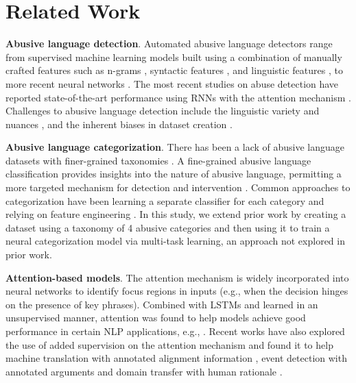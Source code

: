 \documentclass[letterpaper]{article}
\begin{document}
\section{Related Work}
\label{sec:related}

\noindent\textbf{Abusive language detection}. Automated abusive language detectors range from supervised machine learning models built using a combination of manually crafted features such as n-grams \cite{wulczyn2017ex}, syntactic features \cite{nobata2016abusive}, and linguistic features \cite{yin2009detection,joksimovic2019automated}, to more recent neural networks \cite{park2017one,maity2018opinion}.
{The most recent studies on abuse detection have reported  state-of-the-art performance using RNNs with the attention mechanism  \cite{pavlopoulos2017deeper,chakrabarty2019pay}.} Challenges to abusive language detection include the linguistic variety and nuances \cite{nobata2016abusive,schmidt2017survey},  and the inherent biases in dataset creation \cite{vidgen2019challenges}.

\noindent\textbf{Abusive language categorization}. There has been a lack of abusive language datasets with finer-grained taxonomies \cite{park2017one,badjatiya2017deep,fortuna2018survey}. A fine-grained abusive language classification provides insights into the nature of abusive language, permitting a more targeted mechanism for detection and intervention \cite{hoff2009cyberbullying}.
Common approaches to categorization  have been learning a separate classifier for each category and relying on feature engineering \cite{van2015detection,dinakar2011modeling}. In this study, we  extend prior work by creating a dataset using a taxonomy of 4 abusive categories and then using it to train a neural categorization model via multi-task learning, an approach not explored in prior work.


\noindent\textbf{Attention-based models}.
The attention mechanism is widely incorporated into neural networks to identify focus regions in inputs (e.g., when the decision hinges on the presence of key phrases). Combined with LSTMs and learned in an unsupervised manner,  attention was  found to help models achieve good performance in certain NLP applications, e.g., \cite{luong2015effective}. Recent works have also explored the use of added supervision on the attention mechanism and found it  to help machine translation with annotated alignment information  \cite{liu2016neural}, event detection with annotated arguments  \cite{liu2017exploiting} and domain transfer with human rationale \cite{bao2018deriving}.
\end{document}
